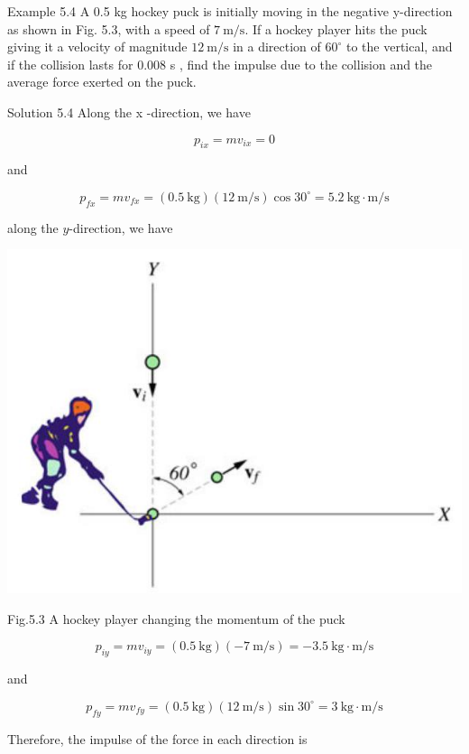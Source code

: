 \documentclass[10pt]{article}
\begin{document}
Example 5.4 A 0.5 kg hockey puck is initially moving in the negative y-direction as shown in Fig. 5.3, with a speed of $7 \mathrm{~m} / \mathrm{s}$. If a hockey player hits the puck giving it a velocity of magnitude $12 \mathrm{~m} / \mathrm{s}$ in a direction of $60^{\circ}$ to the vertical, and if the collision lasts for 0.008 s , find the impulse due to the collision and the average force exerted on the puck.

Solution 5.4 Along the x -direction, we have

$$
p_{i x}=m v_{i x}=0
$$

and

$$
p_{f x}=m v_{f x}=(0.5 \mathrm{~kg})(12 \mathrm{~m} / \mathrm{s}) \cos 30^{\circ}=5.2 \mathrm{~kg} \cdot \mathrm{m} / \mathrm{s}
$$

along the $y$-direction, we have

\begin{center}
\includegraphics[max width=\textwidth]{2024_09_13_db1f357d2aad0a03eb2eg-084}
\end{center}

Fig.5.3 A hockey player changing the momentum of the puck

$$
p_{i y}=m v_{i y}=(0.5 \mathrm{~kg})(-7 \mathrm{~m} / \mathrm{s})=-3.5 \mathrm{~kg} \cdot \mathrm{m} / \mathrm{s}
$$

and

$$
p_{f y}=m v_{f y}=(0.5 \mathrm{~kg})(12 \mathrm{~m} / \mathrm{s}) \sin 30^{\circ}=3 \mathrm{~kg} \cdot \mathrm{m} / \mathrm{s}
$$

Therefore, the impulse of the force in each direction is
\end{document}

